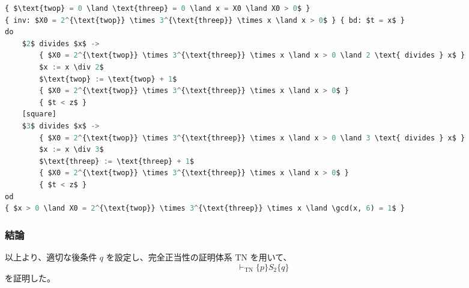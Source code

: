 \documentclass[12pt,a4paper]{article}
\begin{document}
\begin{CJK}{UTF8}{ipxm}
\begin{lstlisting}[language=Python, mathescape=true]
{ $\text{twop} = 0 \land \text{threep} = 0 \land x = X0 \land X0 > 0$ }
{ inv: $X0 = 2^{\text{twop}} \times 3^{\text{threep}} \times x \land x > 0$ } { bd: $t = x$ }
do
    $2$ divides $x$ ->
        { $X0 = 2^{\text{twop}} \times 3^{\text{threep}} \times x \land x > 0 \land 2 \text{ divides } x$ }
        $x := x \div 2$
        $\text{twop} := \text{twop} + 1$
        { $X0 = 2^{\text{twop}} \times 3^{\text{threep}} \times x \land x > 0$ }
        { $t < z$ }
    [square]
    $3$ divides $x$ ->
        { $X0 = 2^{\text{twop}} \times 3^{\text{threep}} \times x \land x > 0 \land 3 \text{ divides } x$ }
        $x := x \div 3$
        $\text{threep} := \text{threep} + 1$
        { $X0 = 2^{\text{twop}} \times 3^{\text{threep}} \times x \land x > 0$ }
        { $t < z$ }
od
{ $x > 0 \land X0 = 2^{\text{twop}} \times 3^{\text{threep}} \times x \land \gcd(x, 6) = 1$ }
\end{lstlisting}

\subsubsection*{結論}

以上より、適切な後条件 $q$ を設定し、完全正当性の証明体系 $\text{TN}$ を用いて、
\[
\vdash_{\text{TN}} \{ p \} S_2 \{ q \}
\]
を証明した。

\end{CJK}
\end{document}
